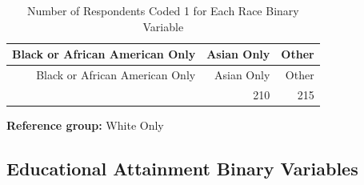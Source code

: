 \documentclass[
]{article}
\begin{document}
\begin{longtable}[]{@{}rrr@{}}
\caption{Number of Respondents Coded 1 for Each Race Binary
Variable}\tabularnewline
\toprule\noalign{}
Black or African American Only & Asian Only & Other \\
\midrule\noalign{}
\endfirsthead
\toprule\noalign{}
Black or African American Only & Asian Only & Other \\
\midrule\noalign{}
\endhead
\bottomrule\noalign{}
\endlastfoot
991 & 210 & 215 \\
\end{longtable}

\textbf{Reference group:} White Only

\newpage

\subsection{Educational Attainment Binary
Variables}\label{educational-attainment-binary-variables}
\end{document}
